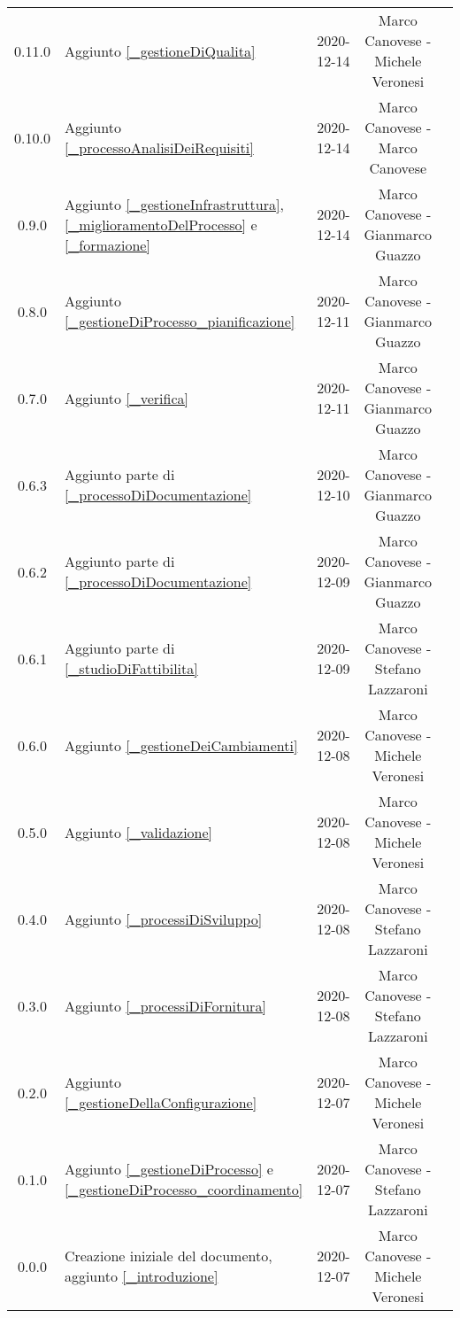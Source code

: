 \begin{center}
\begin{longtable}{|c|p{5cm}|c|c|c|}
		0.11.0 & Aggiunto \ref{_gestioneDiQualita} & 2020-12-14 & Marco Canovese - Michele Veronesi \\
		0.10.0 & Aggiunto \ref{_processoAnalisiDeiRequisiti} & 2020-12-14 & Marco Canovese - Marco Canovese  \\
		0.9.0 & Aggiunto \ref{_gestioneInfrastruttura}, \ref{_miglioramentoDelProcesso} e \ref{_formazione} & 2020-12-14 & Marco Canovese - Gianmarco Guazzo  \\
		0.8.0 & Aggiunto \ref{_gestioneDiProcesso_pianificazione} & 2020-12-11 & Marco Canovese - Gianmarco Guazzo \\
		0.7.0 & Aggiunto \ref{_verifica} & 2020-12-11& Marco Canovese - Gianmarco Guazzo \\
		0.6.3 & Aggiunto parte di \ref{_processoDiDocumentazione} & 2020-12-10 & Marco Canovese - Gianmarco Guazzo \\
		0.6.2 & Aggiunto parte di \ref{_processoDiDocumentazione} & 2020-12-09 & Marco Canovese - Gianmarco Guazzo \\
		0.6.1 & Aggiunto parte di \ref{_studioDiFattibilita} & 2020-12-09 & Marco Canovese - Stefano Lazzaroni  \\
		0.6.0 & Aggiunto \ref{_gestioneDeiCambiamenti} & 2020-12-08 & Marco Canovese - Michele Veronesi \\
		0.5.0 & Aggiunto \ref{_validazione} & 2020-12-08 & Marco Canovese - Michele Veronesi  \\
		0.4.0 & Aggiunto \ref{_processiDiSviluppo} & 2020-12-08 & Marco Canovese - Stefano Lazzaroni  \\
		0.3.0 & Aggiunto \ref{_processiDiFornitura} & 2020-12-08 & Marco Canovese - Stefano Lazzaroni \\
		0.2.0 & Aggiunto \ref{_gestioneDellaConfigurazione} & 2020-12-07 & Marco Canovese - Michele Veronesi  \\
		0.1.0 & Aggiunto \ref{_gestioneDiProcesso} e \ref{_gestioneDiProcesso_coordinamento} & 2020-12-07 & Marco Canovese - Stefano Lazzaroni \\
		0.0.0 & Creazione iniziale del documento, aggiunto \ref{_introduzione} & 2020-12-07 & Marco Canovese - Michele Veronesi \\
		
		\hline
	\end{longtable}
\end{center}